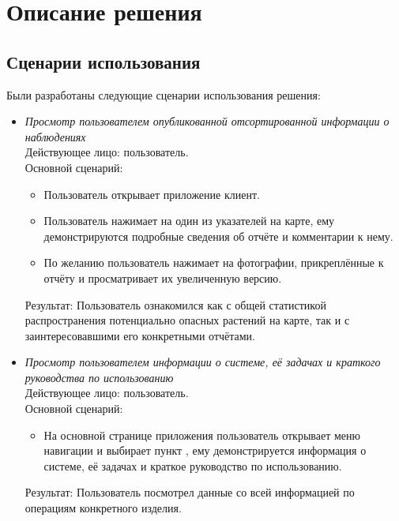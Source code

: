 
\section{Описание решения}

\subsection{Сценарии использования}

\tab
Были разработаны следующие сценарии использования решения:

\begin{itemize}[topsep=0pt, parsep=0pt, itemsep=0pt, wide=0.5cm]
	\item \textit{Просмотр пользователем опубликованной отсортированной информации о наблюдениях} \\
	Действующее лицо: пользователь. \\
	Основной сценарий:
	\begin{itemize}[topsep=0pt, parsep=0pt, itemsep=0pt, wide=0.5cm]
		\item Пользователь открывает приложение клиент.
		\item Пользователь нажимает на один из указателей на карте, ему демонстрируются подробные сведения об отчёте и комментарии к нему.
		\item По желанию пользователь нажимает на фотографии, прикреплённые к отчёту и просматривает их увеличенную версию.
	\end{itemize}
	Результат: Пользователь ознакомился как с общей статистикой распространения потенциально опасных растений на карте, так и с заинтересовавшими его конкретными отчётами.
	
	\item \textit{Просмотр пользователем информации о системе, её задачах и краткого руководства по использованию} \\
	Действующее лицо: пользователь. \\
	Основной сценарий:
	\begin{itemize}[topsep=0pt, parsep=0pt, itemsep=0pt, wide=0.5cm]
		\item На основной странице приложения пользователь открывает меню навигации и выбирает пункт , ему демонстрируется информация о системе, её задачах и краткое руководство по использованию.
	\end{itemize}
	Результат: Пользователь посмотрел данные со всей информацией по операциям конкретного изделия.
	

\end{itemize}
